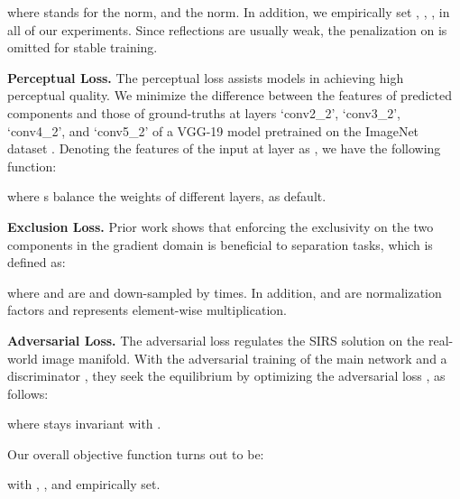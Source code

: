 \documentclass{article}
\begin{document}
where  stands for the  norm, and  the  norm. In addition, we empirically set , , ,  in all of our experiments. Since reflections are usually weak, the penalization on  is omitted for stable training.

\par \noindent \textbf{Perceptual Loss.} The perceptual loss \cite{DBLP:conf/eccv/JohnsonAF16} assists models in achieving high perceptual quality. We minimize the  difference between the features of predicted components and those of ground-truths at layers `conv2\_2',
`conv3\_2', `conv4\_2', and `conv5\_2' of a VGG-19 model \cite{DBLP:journals/corr/SimonyanZ14a} pretrained on the ImageNet dataset \cite{DBLP:conf/cvpr/DengDSLL009}. Denoting the features of the input at layer  as , we have the following function:

where s balance the weights of different layers,  as default.

\par \noindent \textbf{Exclusion Loss.} Prior work \cite{DBLP:journals/tog/Freeman15,DBLP:conf/cvpr/ZhangNC18a} shows that enforcing the exclusivity on the two components in the gradient domain is beneficial to separation tasks, which is defined as: 

where  and  are  and  down-sampled by  times. In addition,  and  are normalization factors and  represents element-wise multiplication. 

\par \noindent \textbf{Adversarial Loss.} 
The adversarial loss regulates the SIRS solution on the real-world image manifold. With the adversarial training of the main network  and a discriminator , they seek the equilibrium by optimizing the adversarial loss  \cite{DBLP:conf/iclr/Jolicoeur-Martineau19}, as follows: 

where  stays invariant with \cite{DBLP:conf/cvpr/WeiYFW019}. 

Our overall objective function turns out to be:

with , , and  empirically set.
\end{document}
